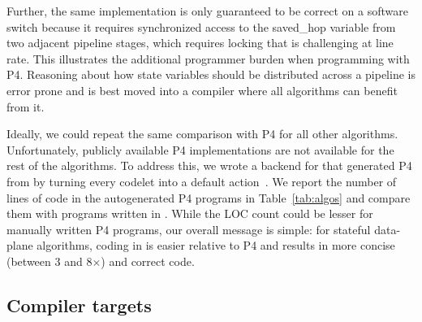 Further, the same implementation is only guaranteed to be correct on a
software switch because it requires synchronized access to the
saved\_hop variable from two adjacent pipeline stages, which requires
locking that is challenging at line rate. This illustrates the
additional programmer burden when programming with P4. Reasoning about
how state variables should be distributed across a pipeline is error
prone and is best moved into a compiler where all algorithms can
benefit from it.

Ideally, we could repeat the same comparison with P4 for all other
algorithms.  
Unfortunately, publicly available P4 implementations are not available
for the rest of the algorithms.  To address this, we wrote a backend
for \pktlanguage that generated P4 from \pktlanguage by turning every
codelet into a default action~\cite{p4spec}.  We report the number of
lines of code in the autogenerated P4 programs in
Table~\ref{tab:algos} and compare them with programs written in
\pktlanguage. While the LOC count could be lesser for manually written
P4 programs, our overall message is simple: for stateful data-plane
algorithms, coding in \pktlanguage is easier relative to P4 and
results in more concise (between 3 and 8$\times$) and correct code.


\subsection{Compiler targets}
\label{ss:targets}

